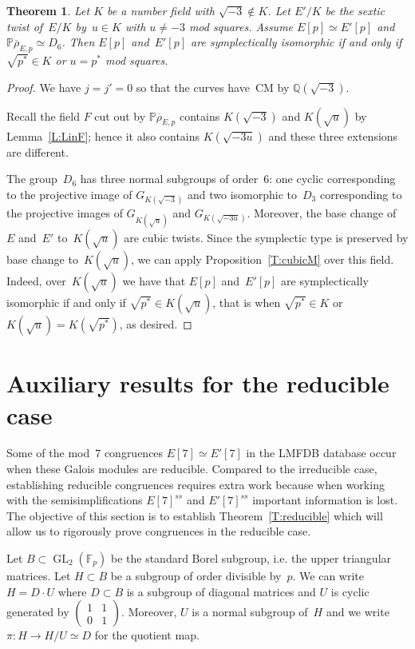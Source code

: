 \documentclass[12pt, reqno]{amsart}
\newcommand{\F}{\mathbb{F}}
\newcommand{\PP}{\mathbb{P}}
\newcommand{\Q}{\mathbb{Q}}
\newcommand{\rhobar}{{\overline{\rho}}}
\newcommand{\GL}{\operatorname{GL}}
\numberwithin{equation}{section}
\newtheorem{theorem}{Theorem}[section]
\theoremstyle{definition}
\theoremstyle{remark}
\begin{document}
\begin{theorem}\label{T:sexticM} 
Let $K$ be a number field with $\sqrt{-3} \not\in K$. 
Let $E'/K$ be the sextic twist of~$E/K$ by~$u \in K$ with $u \neq -3$ mod squares. 
Assume $E[p] \simeq E'[p]$
and $\PP \rhobar_{E,p} \simeq D_6$.
Then $E[p]$ and~$E'[p]$ are symplectically isomorphic if and only if
$\sqrt{p^*} \in K$ or $u = p^*$ mod squares.
\end{theorem}
\begin{proof}   
We have $j=j'=0$ so that the curves have~CM by $\Q(\sqrt{-3})$. 

Recall the field $F$ cut out by $\PP \rhobar_{E,p}$ 
contains $K(\sqrt{-3})$ 
and $K(\sqrt{u})$ by Lemma~\ref{L:LinF}; 
hence it also contains $K(\sqrt{-3u})$ and these three extensions are different.


The group~$D_6$ has three normal subgroups of order~$6$: one cyclic corresponding to the projective image of $G_{K(\sqrt{-3})}$ and two isomorphic to~$D_3$ corresponding to the projective images of
$G_{K(\sqrt{u})}$ and $G_{K(\sqrt{-3u})}$.
Moreover, the base change of~$E$ and~$E'$ 
to~$K(\sqrt{u})$ are cubic twists. Since the 
symplectic type is preserved by base change 
to~$K(\sqrt{u})$, we can apply Proposition~\ref{T:cubicM} over this field.
Indeed, over~$K(\sqrt{u})$ we have that $E[p]$ and~$E'[p]$ are symplectically isomorphic if and only if
$\sqrt{p^*} \in K(\sqrt{u})$, that is when
$\sqrt{p^*} \in K$ or $K(\sqrt{u}) = K(\sqrt{p^*})$, as desired.
\end{proof}


\section{Auxiliary results for the reducible case}

Some of the mod~$7$ congruences 
$E[7] \simeq E'[7]$ in the LMFDB database occur 
when these Galois modules are reducible. Compared to the irreducible case, establishing reducible congruences requires extra work because when working with the semisimplifications $E[7]^{ss}$ and $E'[7]^{ss}$ important information is lost.
The objective of this section is to establish Theorem~\ref{T:reducible} which will allow us to rigorously prove congruences in the reducible case.


Let $B \subset \GL_2(\F_p)$ be the standard Borel subgroup, i.e. the
upper triangular matrices. Let $H \subset B$ be a subgroup of order
divisible by~$p$.  We can write~$H = D\cdot U$ where $D \subset B$ is
a subgroup of diagonal matrices and $U$ is cyclic generated by
$\left(\begin{smallmatrix} 1 & 1 \\ 0 & 1
                            \end{smallmatrix} \right)$.   
Moreover, $U$ is a normal subgroup of~$H$ 
and we write $\pi : H \to H/U \simeq D$ for the quotient map.
\end{document}
